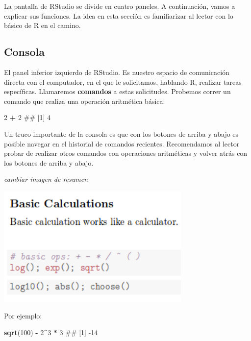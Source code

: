 \documentclass[]{book}
\newenvironment{Shaded}{\begin{snugshade}}{\end{snugshade}}
\newcommand{\KeywordTok}[1]{\textcolor[rgb]{0.13,0.29,0.53}{\textbf{#1}}}
\newcommand{\DecValTok}[1]{\textcolor[rgb]{0.00,0.00,0.81}{#1}}
\newcommand{\StringTok}[1]{\textcolor[rgb]{0.31,0.60,0.02}{#1}}
\newcommand{\OperatorTok}[1]{\textcolor[rgb]{0.81,0.36,0.00}{\textbf{#1}}}
\newcommand{\NormalTok}[1]{#1}
\begin{document}
La pantalla de RStudio se divide en cuatro paneles. A continuación,
vamos a explicar sus funciones. La idea en esta sección es familiarizar
al lector con lo básico de R en el camino.

\subsection{Consola}\label{consola}

El panel inferior izquierdo de RStudio. Es nuestro espacio de
comunicación directa con el computador, en el que le solicitamos,
hablando R, realizar tareas específicas. Llamaremos \textbf{comandos} a
estas solicitudes. Probemos correr un comando que realiza una operación
aritmética básica:

\begin{Shaded}
\begin{Highlighting}[]
\DecValTok{2} \OperatorTok{+}\StringTok{ }\DecValTok{2}
\NormalTok{## [1] 4}
\end{Highlighting}
\end{Shaded}

Un truco importante de la consola es que con los botones de arriba y
abajo es posible navegar en el historial de comandos recientes.
Recomendamos al lector probar de realizar otros comandos con operaciones
aritméticas y volver atrás con los botones de arriba y abajo.

\emph{cambiar imagen de resumen}

\begin{center}\includegraphics[width=3.76in]{00-images/rbas-basiccalc} \end{center}

Por ejemplo:

\begin{Shaded}
\begin{Highlighting}[]
\KeywordTok{sqrt}\NormalTok{(}\DecValTok{100}\NormalTok{) }\OperatorTok{-}\StringTok{ }\DecValTok{2}\OperatorTok{^}\DecValTok{3} \OperatorTok{*}\StringTok{ }\DecValTok{3}
\NormalTok{## [1] -14}
\end{Highlighting}
\end{Shaded}
\end{document}
